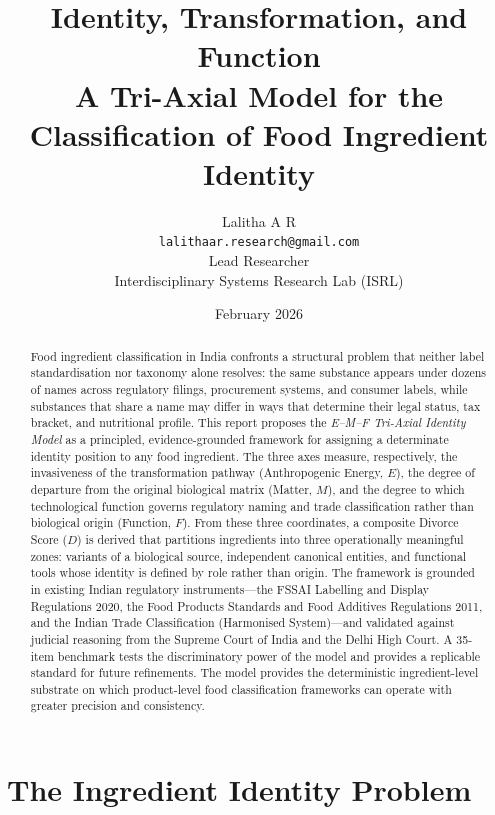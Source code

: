 \documentclass[12pt,a3paper]{article}
\title{%
  \textbf{Identity, Transformation, and Function}\\[0.4em]
   A Tri-Axial Model for the Classification of Food Ingredient Identity\\[0.4em]
}
\author{Lalitha A R\\
\texttt{lalithaar.research@gmail.com}\\
Lead Researcher\\
Interdisciplinary Systems Research Lab (ISRL)}
\date{February 2026}
\begin{document}
\maketitle
\thispagestyle{empty}

\begin{abstract}
\noindent
Food ingredient classification in India confronts a structural problem that neither label standardisation nor taxonomy alone resolves: the same substance appears under dozens of names across regulatory filings, procurement systems, and consumer labels, while substances that share a name may differ in ways that determine their legal status, tax bracket, and nutritional profile. This report proposes the \textit{E--M--F Tri-Axial Identity Model} as a principled, evidence-grounded framework for assigning a determinate identity position to any food ingredient. The three axes measure, respectively, the invasiveness of the transformation pathway (Anthropogenic Energy, $E$), the degree of departure from the original biological matrix (Matter, $M$), and the degree to which technological function governs regulatory naming and trade classification rather than biological origin (Function, $F$). From these three coordinates, a composite Divorce Score ($D$) is derived that partitions ingredients into three operationally meaningful zones: variants of a biological source, independent canonical entities, and functional tools whose identity is defined by role rather than origin. The framework is grounded in existing Indian regulatory instruments---the FSSAI Labelling and Display Regulations 2020, the Food Products Standards and Food Additives Regulations 2011, and the Indian Trade Classification (Harmonised System)---and validated against judicial reasoning from the Supreme Court of India and the Delhi High Court. A 35-item benchmark tests the discriminatory power of the model and provides a replicable standard for future refinements. The model provides the deterministic ingredient-level substrate on which product-level food classification frameworks can operate with greater precision and consistency.
\end{abstract}

\newpage
\tableofcontents
\newpage


\section{The Ingredient Identity Problem}
\label{ch:problem}
\end{document}

